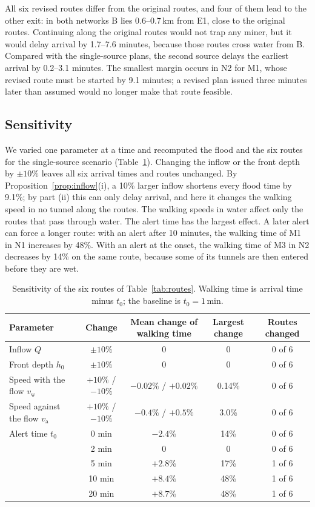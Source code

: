 \documentclass[11pt,a4paper]{article}
\theoremstyle{plain}
\theoremstyle{definition}
\theoremstyle{remark}
\newcommand{\vw}{v_{\mathrm{w}}}
\newcommand{\va}{v_{\mathrm{a}}}
\begin{document}
All six revised routes differ from the original routes, and four of them lead to the other exit: in both networks B lies 0.6--0.7\,km from E1, close to the original routes. Continuing along the original routes would not trap any miner, but it would delay arrival by 1.7--7.6 minutes, because those routes cross water from B. Compared with the single-source plans, the second source delays the earliest arrival by 0.2--3.1 minutes. The smallest margin occurs in N2 for M1, whose revised route must be started by 9.1 minutes; a revised plan issued three minutes later than assumed would no longer make that route feasible.

\subsection{Sensitivity}
We varied one parameter at a time and recomputed the flood and the six routes for the single-source scenario (Table~\ref{tab:sens}). Changing the inflow or the front depth by $\pm10\%$ leaves all six arrival times and routes unchanged. By Proposition~\ref{prop:inflow}(i), a 10\% larger inflow shortens every flood time by 9.1\%; by part (ii) this can only delay arrival, and here it changes the walking speed in no tunnel along the routes. The walking speeds in water affect only the routes that pass through water. The alert time has the largest effect. A later alert can force a longer route: with an alert after 10 minutes, the walking time of M1 in N1 increases by 48\%. With an alert at the onset, the walking time of M3 in N2 decreases by 14\% on the same route, because some of its tunnels are then entered before they are wet.

\begin{table}[htbp]
  \centering\small
  \begin{tabular}{@{}l c c c c@{}}
    \toprule
    Parameter & Change & Mean change of walking time & Largest change & Routes changed \\
    \midrule
    Inflow $Q$                & $\pm10\%$ & 0 & 0 & 0 of 6 \\
    Front depth $h_0$         & $\pm10\%$ & 0 & 0 & 0 of 6 \\
    Speed with the flow $\vw$ & $+10\%$ / $-10\%$ & $-0.02\%$ / $+0.02\%$ & 0.14\% & 0 of 6 \\
    Speed against the flow $\va$ & $+10\%$ / $-10\%$ & $-0.4\%$ / $+0.5\%$ & 3.0\% & 0 of 6 \\
    Alert time $t_0$          & 0 min  & $-2.4\%$ & 14\% & 0 of 6 \\
                              & 2 min  & 0        & 0    & 0 of 6 \\
                              & 5 min  & $+2.8\%$ & 17\% & 1 of 6 \\
                              & 10 min & $+8.4\%$ & 48\% & 1 of 6 \\
                              & 20 min & $+8.7\%$ & 48\% & 1 of 6 \\
    \bottomrule
  \end{tabular}
  \caption{Sensitivity of the six routes of Table~\ref{tab:routes}. Walking time is arrival time minus $t_0$; the baseline is $t_0 = 1$\,min.}
  \label{tab:sens}
\end{table}
\end{document}
